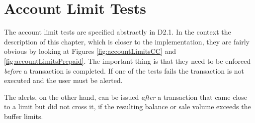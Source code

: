 \section{Account Limit Tests}
The account limit tests are specified abstractly in D2.1. In the context the description of this chapter, which is closer to the implementation, they are fairly obvious by looking at Figures \ref{fig:accountLimitsCC} and \ref{fig:accountLimitsPrepaid}. The important thing is that they need to be enforced \emph{before} a transaction is completed. If one of the tests fails the transaction is not executed and the user must be alerted.

The alerts, on the other hand, can be issued \emph{after} a transaction that came close to a limit but did not cross it, if the resulting balance or sale volume exceeds the buffer limits.



























